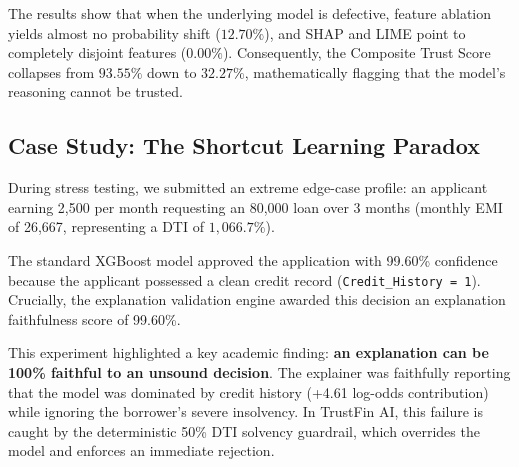 \documentclass[conference]{IEEEtran}
\begin{document}
\begin{table}[htbp]
\caption{Trust Score Behavior Under Model Degradation}
\label{tab:ablation}
\centering
{}
\end{table}

The results show that when the underlying model is defective, feature ablation yields almost no probability shift ($12.70\%$), and SHAP and LIME point to completely disjoint features ($0.00\%$). Consequently, the Composite Trust Score collapses from $93.55\%$ down to $32.27\%$, mathematically flagging that the model's reasoning cannot be trusted.

\subsection{Case Study: The Shortcut Learning Paradox}
During stress testing, we submitted an extreme edge-case profile: an applicant earning  2,500 per month requesting an  80,000 loan over 3 months (monthly EMI of  26,667, representing a DTI of $1,066.7\%$). 

The standard XGBoost model approved the application with 99.60\% confidence because the applicant possessed a clean credit record (\texttt{Credit\_History = 1}). Crucially, the explanation validation engine awarded this decision an explanation faithfulness score of 99.60\%. 

This experiment highlighted a key academic finding: \textbf{an explanation can be 100\% faithful to an unsound decision}. The explainer was faithfully reporting that the model was dominated by credit history (+4.61 log-odds contribution) while ignoring the borrower's severe insolvency. In TrustFin AI, this failure is caught by the deterministic 50\% DTI solvency guardrail, which overrides the model and enforces an immediate rejection.
\end{document}
